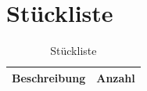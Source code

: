 \documentclass[Bachelor, BMR, ngerman]{twbook}
\begin{document}
\newpage
\appendix

\clearpage   
\chapter{Stückliste}
\label{app:stückliste}

    \begin{table}[!htbp]
        \centering
        \caption{Stückliste}\label{tab:stückliste}
            
            \begin{tabular}{| l | c |}\hline \rowcolor[gray]{0.8}
                Beschreibung & Anzahl\\\hline
                

\end{tabular}
\end{table}
\end{document}
